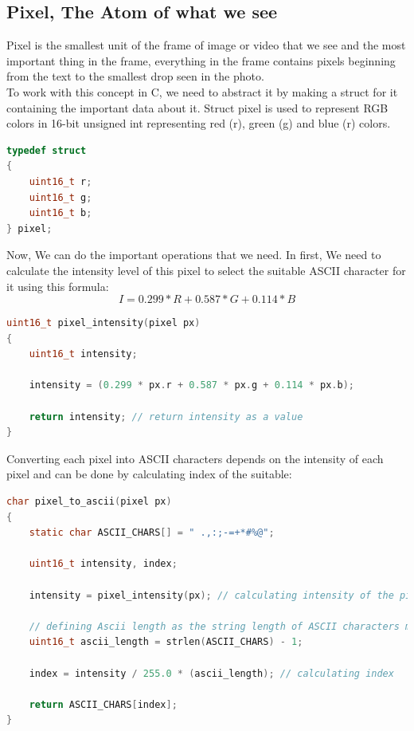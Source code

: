 \documentclass[a4paper,12pt]{article}
\begin{document}
\subsection{Pixel, The Atom of what we see}
Pixel is the smallest unit of the frame of image or video that we see and the most important thing in the frame, everything in the frame contains pixels beginning from the text to the smallest drop seen in the photo. \\

To work with this concept in C, we need to abstract it by making a struct for it containing the important data about it. Struct pixel is used to represent RGB colors in 16-bit unsigned int representing red (r), green (g) and blue (r) colors.

\begin{lstlisting}[language=c] 
typedef struct
{
    uint16_t r;
    uint16_t g;
    uint16_t b;
} pixel;
\end{lstlisting}
\newpage
Now, We can do the important operations that we need. In first, We need to calculate the intensity level of this pixel to select the suitable ASCII character for it using this formula:
$$I = 0.299*R + 0.587*G + 0.114*B$$ 

\begin{lstlisting}[language=c]
uint16_t pixel_intensity(pixel px)
{
    uint16_t intensity;

    intensity = (0.299 * px.r + 0.587 * px.g + 0.114 * px.b);

    return intensity; // return intensity as a value
}
\end{lstlisting}
Converting each pixel into ASCII characters depends on the intensity of each pixel and can be done by calculating index of the suitable:

\begin{lstlisting}[language=c]
char pixel_to_ascii(pixel px)
{
    static char ASCII_CHARS[] = " .,:;-=+*#%@";

    uint16_t intensity, index;

    intensity = pixel_intensity(px); // calculating intensity of the pixel

    // defining Ascii length as the string length of ASCII characters minus 1
    uint16_t ascii_length = strlen(ASCII_CHARS) - 1; 

    index = intensity / 255.0 * (ascii_length); // calculating index

    return ASCII_CHARS[index];
}


\end{lstlisting}
\end{document}
